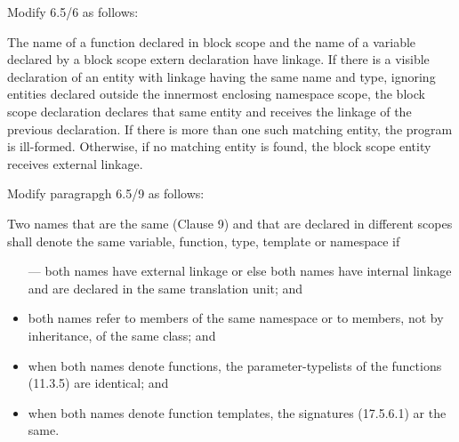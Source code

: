 \noindent
Modify 6.5/6 as follows:
\begin{std.txt}
\resetalinea[5]
\alinea
The name of a function declared in block scope and the name of a
variable declared by a block scope extern declaration have linkage. If
there is a visible declaration of an entity with linkage having the
same name and type, ignoring entities declared outside the innermost
enclosing namespace scope, the block scope declaration declares that
same entity and receives the linkage of the previous declaration. 
 If
there is more than one such matching entity, the program is
ill-formed. Otherwise, if no matching entity is found, the block scope
entity receives external linkage.
\end{std.txt}

\noindent
Modify paragrapgh 6.5/9 as follows:
\begin{std.txt}
  \resetalinea[8]
  \alinea
  Two names that are the same (Clause 9) and that are declared in different scopes
  shall denote the same variable, function, type, template or namespace if
  \begin{itemize}
    \item[---] both names have external  linkage
    \added{,} 
     or else both names have internal linkage and are declared in
      the same translation unit; and

      \item both names refer to members of the same namespace or to members,
      not by inheritance, of the same class; and

      \item when both names denote functions, the parameter-typelists of the
      functions (11.3.5) are identical; and

      \item when both names denote function templates, the signatures (17.5.6.1)
      ar the same.
  \end{itemize}
\end{std.txt}


